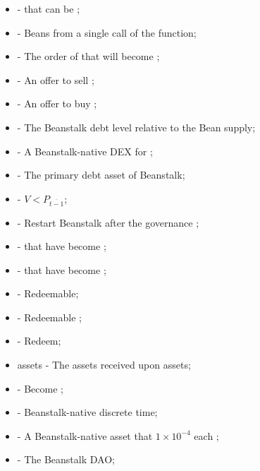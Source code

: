 \documentclass[class=article, crop=false]{standalone}
\begin{document}
\begin{itemize}[topsep=0pt, itemsep=3pt,leftmargin=16pt]
    \item[]  - \hypertarget{ht148}{ that can be };
    \item[]  - \hypertarget{ht149}{Beans  from a single call of the  function};
    \item[]  - \hypertarget{ht150}{The order of  that will become };
    \item[]  - \hypertarget{ht151}{An offer to sell };
    \item[]  - \hypertarget{ht152}{An offer to buy };
    \item[]  - \hypertarget{ht153}{The Beanstalk debt level relative to the Bean supply};
    \item[]  - \hypertarget{ht154}{A Beanstalk-native DEX for };
    \item[]  - \hypertarget{ht155}{The primary debt asset of Beanstalk};
    \item[]  - \hypertarget{ht161}{$V < P_{\overline{t-1}}$};
    \item[]  - \hypertarget{ht162}{Restart Beanstalk after the governance };
    \item[]  - \hypertarget{ht163}{ that have become };
    \item[]  - \hypertarget{ht164}{ that have become };
    \item[]  - \hypertarget{ht165}{Redeemable};
    \item[]  - \hypertarget{ht166}{Redeemable };
    \item[]  - \hypertarget{ht167}{Redeem};
    \item[]  assets - \hypertarget{ht168}{The assets received upon   assets};
    \item[]  - \hypertarget{ht169}{Become };
    \item[]  - \hypertarget{ht176}{Beanstalk-native discrete time};
    \item[]  - \hypertarget{ht176}{A Beanstalk-native asset that  $1 \times 10^{-4}$  each };
    \item[]  - \hypertarget{ht177}{The Beanstalk DAO};

\end{itemize}
\end{document}
